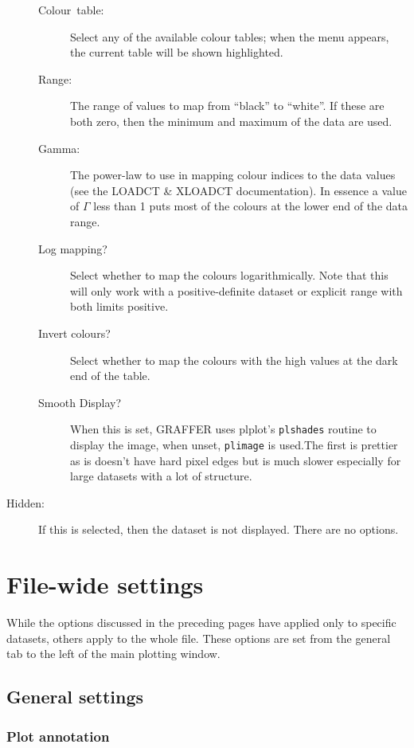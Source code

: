 \documentclass[11pt,twoside,english]{article}
\begin{document}
\begin{description}
  \begin{description}
  \item [Colour~table:]Select any of the available colour tables; when
    the menu appears, the current table will be shown highlighted.
  \item [Range:]The range of values to map from {}``black'' to
    {}``white''.  If these are both zero, then the minimum and maximum
    of the data are used.
  \item [Gamma:]The power-law to use in mapping colour indices to the
    data values (see the LOADCT \& XLOADCT documentation). In essence a
    value of $\Gamma$ less than 1 puts most of the colours at the lower
    end of the data range.
   \item[Log mapping?] Select whether to map the colours
    logarithmically. Note that this will only work with a
    positive-definite dataset or explicit range with both limits
    positive.
  \item[Invert colours?] Select whether to map the colours with the
    high values at the dark end of the table.
  \item[Smooth Display?] When this is set, GRAFFER uses plplot's
    \texttt{plshades} routine to display the image, when unset,
    \texttt{plimage} is used.The first is prettier as is doesn't have
    hard pixel edges but is much slower especially for large datasets
    with a lot of structure.
  \end{description}
\item[Hidden:] If this is selected, then the dataset is not
  displayed. There are no options.
\end{description}

\section{File-wide settings}

While the options discussed in the preceding pages have applied only to
specific datasets, others apply to the whole file. These options are
set from the \textsf{general} tab to the left of the main plotting
window.


\subsection{General settings}


\subsubsection{Plot annotation}
\end{document}
